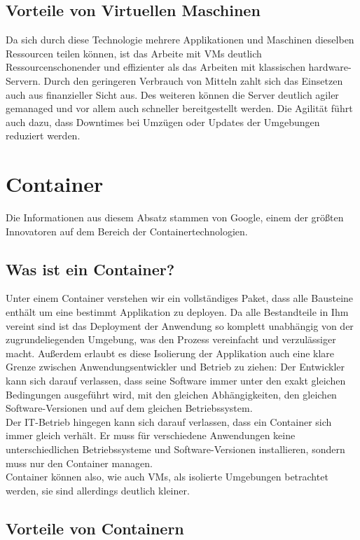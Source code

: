 \subsection{Vorteile von Virtuellen Maschinen}
Da sich durch diese Technologie mehrere Applikationen und Maschinen dieselben Ressourcen teilen können, ist das Arbeite mit \ac{VM}s deutlich Ressourcenschonender und effizienter als das Arbeiten mit klassischen hardware-Servern.
Durch den geringeren Verbrauch von Mitteln zahlt sich das Einsetzen auch aus finanzieller Sicht aus.
Des weiteren können die Server deutlich agiler gemanaged und vor allem auch schneller bereitgestellt werden.
Die Agilität führt auch dazu, dass Downtimes bei Umzügen oder Updates der Umgebungen reduziert werden.



\section{Container}
Die Informationen aus diesem Absatz stammen von Google\cite{containers}, einem der größten Innovatoren auf dem Bereich der Containertechnologien.
\subsection{Was ist ein Container?}
Unter einem Container verstehen wir ein vollständiges Paket, dass alle Bausteine enthält um eine bestimmt Applikation zu deployen.
Da alle Bestandteile in Ihm vereint sind ist das Deployment der Anwendung so komplett unabhängig von der zugrundeliegenden Umgebung, was den Prozess vereinfacht und verzulässiger macht.
Außerdem erlaubt es diese Isolierung der Applikation auch eine klare Grenze zwischen Anwendungsentwickler und Betrieb zu ziehen:
Der Entwickler kann sich darauf verlassen, dass seine Software immer unter den exakt gleichen Bedingungen ausgeführt wird, mit den gleichen Abhängigkeiten, den gleichen Software-Versionen und auf dem gleichen Betriebssystem.
\\
Der IT-Betrieb hingegen kann sich darauf verlassen, dass ein Container sich immer gleich verhält. 
Er muss für verschiedene Anwendungen keine unterschiedlichen Betriebssysteme und Software-Versionen installieren, sondern muss nur den Container managen.
\\
Container können also, wie auch \ac{VM}s, als isolierte Umgebungen betrachtet werden, sie sind allerdings deutlich kleiner.

\subsection{Vorteile von Containern}


